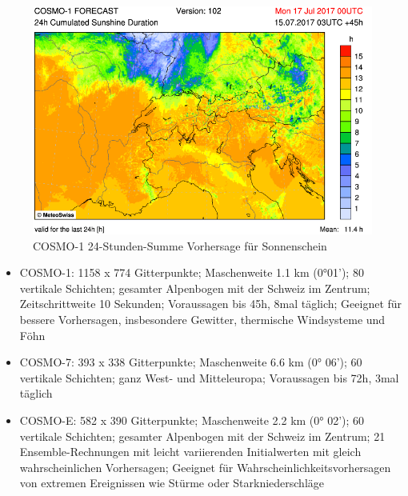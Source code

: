 \begin{refsection}
\begin{figure}
\centering
\includegraphics[width=\hsize]{klima/cosmo1.png}
\caption{COSMO-1 24-Stunden-Summe Vorhersage für Sonnenschein \cite{klima:meteoschweiz}
\label{klima:wettervorhersagen:cosmo}}
\end{figure}

\begin{itemize}
\item COSMO-1: 1158 x 774 Gitterpunkte; Maschenweite 1.1 km (0°01'); 80 vertikale Schichten; gesamter Alpenbogen mit der Schweiz im Zentrum; Zeitschrittweite 10 Sekunden; Voraussagen bis 45h, 8mal täglich; Geeignet für bessere Vorhersagen, insbesondere Gewitter, thermische Windsysteme und Föhn \cite{klima:meteoschweiz}
\item COSMO-7: 393 x 338 Gitterpunkte; Maschenweite 6.6 km (0° 06'); 60 vertikale Schichten; ganz West- und Mitteleuropa; Voraussagen bis 72h, 3mal täglich \cite{klima:meteoschweiz} 
\item COSMO-E: 582 x 390 Gitterpunkte; Maschenweite 2.2 km (0° 02'); 60 vertikale Schichten; gesamter Alpenbogen mit der Schweiz im Zentrum; 21 Ensemble-Rechnungen mit leicht variierenden Initialwerten mit gleich wahrscheinlichen Vorhersagen; Geeignet für Wahrscheinlichkeitsvorhersagen von extremen Ereignissen wie Stürme oder Starkniederschläge \cite{klima:meteoschweiz} 
\end{itemize}




\end{refsection}
